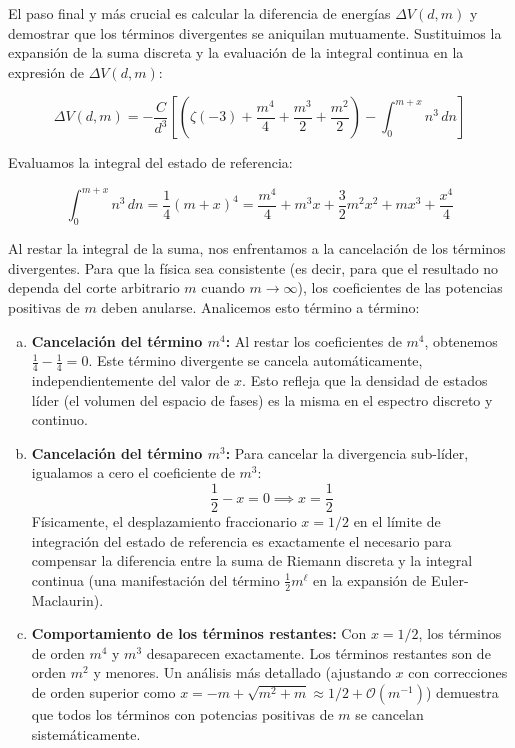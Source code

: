 El paso final y más crucial es calcular la diferencia de energías $\Delta V(d, m)$ y demostrar que los términos divergentes se aniquilan mutuamente. Sustituimos la expansión de la suma discreta y la evaluación de la integral continua en la expresión de $\Delta V(d, m)$:

$$ \Delta V(d, m) = - \frac{C}{d^3} \left[ \left( \zeta(-3) + \frac{m^4}{4} + \frac{m^3}{2} + \frac{m^2}{2} \right) - \int_{0}^{m+x} n^3 \, dn \right] $$

Evaluamos la integral del estado de referencia:

$$ \int_{0}^{m+x} n^3 \, dn = \frac{1}{4}(m+x)^4 = \frac{m^4}{4} + m^3 x + \frac{3}{2} m^2 x^2 + m x^3 + \frac{x^4}{4} $$

Al restar la integral de la suma, nos enfrentamos a la cancelación de los términos divergentes. Para que la física sea consistente (es decir, para que el resultado no dependa del corte arbitrario $m$ cuando $m \to \infty$), los coeficientes de las potencias positivas de $m$ deben anularse. Analicemos esto término a término:

\begin{enumerate}[a)]
    \item \textbf{Cancelación del término $m^4$:} Al restar los coeficientes de $m^4$, obtenemos $\frac{1}{4} - \frac{1}{4} = 0$. Este término divergente se cancela automáticamente, independientemente del valor de $x$. Esto refleja que la densidad de estados líder (el volumen del espacio de fases) es la misma en el espectro discreto y continuo.
    
    \item \textbf{Cancelación del término $m^3$:} Para cancelar la divergencia sub-líder, igualamos a cero el coeficiente de $m^3$:
    $$ \frac{1}{2} - x = 0 \implies x = \frac{1}{2} $$
    Físicamente, el desplazamiento fraccionario $x = 1/2$ en el límite de integración del estado de referencia es exactamente el necesario para compensar la diferencia entre la suma de Riemann discreta y la integral continua (una manifestación del término $\frac{1}{2}m^\ell$ en la expansión de Euler-Maclaurin).
    
    \item \textbf{Comportamiento de los términos restantes:} Con $x = 1/2$, los términos de orden $m^4$ y $m^3$ desaparecen exactamente. Los términos restantes son de orden $m^2$ y menores. Un análisis más detallado (ajustando $x$ con correcciones de orden superior como $x = -m + \sqrt{m^2+m} \approx 1/2 + \mathcal{O}(m^{-1})$) demuestra que todos los términos con potencias positivas de $m$ se cancelan sistemáticamente.
\end{enumerate}

